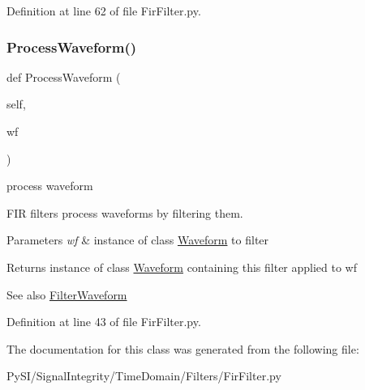 Definition at line 62 of file Fir\+Filter.\+py.

\mbox{\label{classSignalIntegrity_1_1TimeDomain_1_1Filters_1_1FirFilter_1_1FirFilter_ae09bec195c9cb1d5819e73b7be169b11}} 
\subsubsection{\texorpdfstring{Process\+Waveform()}{ProcessWaveform()}}
{\footnotesize\ttfamily def Process\+Waveform (\begin{DoxyParamCaption}\item[{}]{self,  }\item[{}]{wf }\end{DoxyParamCaption})}



process waveform 

F\+IR filters process waveforms by filtering them.


\begin{DoxyParams}{Parameters}
{\em wf} & instance of class \hyperlink{namespaceSignalIntegrity_1_1TimeDomain_1_1Waveform}{Waveform} to filter \\
\hline
\end{DoxyParams}
\begin{DoxyReturn}{Returns}
instance of class \hyperlink{namespaceSignalIntegrity_1_1TimeDomain_1_1Waveform}{Waveform} containing this filter applied to wf 
\end{DoxyReturn}
\begin{DoxySeeAlso}{See also}
\hyperlink{classSignalIntegrity_1_1TimeDomain_1_1Filters_1_1FirFilter_1_1FirFilter_a84e73c18250ca4a61482f94ad61e735b}{Filter\+Waveform} 
\end{DoxySeeAlso}


Definition at line 43 of file Fir\+Filter.\+py.



The documentation for this class was generated from the following file\+:\begin{DoxyCompactItemize}
\item 
Py\+S\+I/\+Signal\+Integrity/\+Time\+Domain/\+Filters/Fir\+Filter.\+py\end{DoxyCompactItemize}
